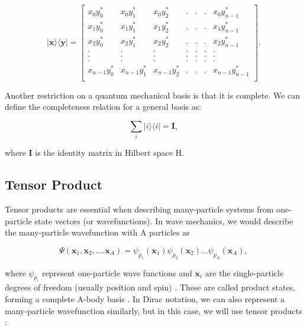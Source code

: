 \begin{equation}
    |\textbf{x} \rangle \langle \textbf{y} | = \begin{bmatrix}
        x_0y_0^* & x_0y_1^* & x_0y_2^* & . & . & . & x_0y_{n-1}^* \\
        x_1y_0^* & x_1y_1^* & x_1y_2^* & . & . & . & x_1y_{n-1}^* \\        
        x_2y_0^* & x_2y_1^* & x_2y_2^* & . & . & . & x_2y_{n-1}^* \\   
        . & . & . & . & . & . & . \\
        . & . & . & . & . & . & . \\
        . & . & . & . & . & . & . \\        
        x_{n-1}y_0^* & x_{n-1}y_1^* & x_{n-1}y_2^* & . & . & . & x_{n-1}y_{n-1}^* \\           
    \end{bmatrix}.
\end{equation}

Another restriction on a quantum mechanical basis is that it is complete. We can define the completeness relation for a general basis as: 

\begin{equation}\label{completeness}
    \sum_i |i\rangle \langle i | = \textbf{I},
\end{equation}

where \textbf{I} is the identity matrix in Hilbert space H.


\subsection*{Tensor Product}

Tensor products are essential when describing many-particle systems from one-particle state vectors (or wavefunctions). In wave mechanics, we would describe the many-particle wavefunction with A particles as

\begin{equation}\label{many_body_wavefunction}
    \Psi (\textbf{x}_1, \textbf{x}_2, .... \textbf{x}_A) = \psi_{p_1}(\textbf{x}_1)\psi_{p_2}(\textbf{x}_2)...\psi_{p_A}(\textbf{x}_A),
\end{equation}

where $\psi_{p_i}$ represent one-particle wave functions and $\textbf{x}_i$ are the single-particle degrees of freedom (usually position and spin) \cite{Ref5}. These are called product states, forming a complete A-body basis \cite{Ref5}. In Dirac notation, we can also represent a many-particle wavefunction similarly, but in this case, we will use tensor products \cite{Ref5}:

